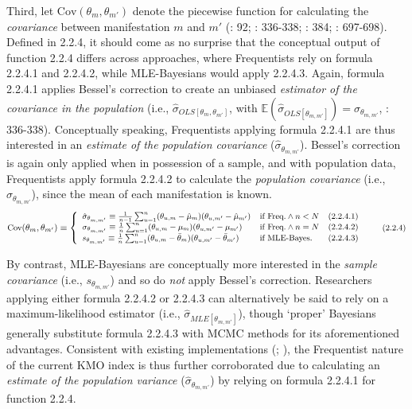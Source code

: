 \documentclass[
  10pt,
  a4paper,
  twoside]{article}
\begin{document}
Third, let \(\text{Cov}(\theta_m, \theta_{m'})\) denote the piecewise function for calculating the \emph{covariance} between manifestation \(m\) and \(m'\) (: 92; : 336-338; : 384; : 697-698). Defined in 2.2.4, it should come as no surprise that the conceptual output of function 2.2.4 differs across approaches, where Frequentists rely on formula 2.2.4.1 and 2.2.4.2, while MLE-Bayesians would apply 2.2.4.3. Again, formula 2.2.4.1 applies Bessel's correction to create an unbiased \emph{estimator of the covariance in the population} (i.e., \(\hat{\sigma}_{OLS[\theta_m, \theta_{m'}]}\), with \(\mathbb{E}(\hat{\sigma}_{OLS[\theta_{m,m'}]}) = \sigma_{\theta_{m,m'}}\), : 336-338). Conceptually speaking, Frequentists applying formula 2.2.4.1 are thus interested in an \emph{estimate of the population covariance} (\(\hat{\sigma}_{\theta_{m,m'}}\)). Bessel's correction is again only applied when in possession of a sample, and with population data, Frequentists apply formula 2.2.4.2 to calculate the \emph{population covariance} (i.e., \(\sigma_{\theta_{m,m'}}\)), since the mean of each manifestation is known.
\[
\small
\text{Cov}(\theta_m, \theta_{m'}) \equiv
\left\{
\begin{array}{lll}
  \hat{\sigma}_{\theta_{m,m'}} \equiv \frac{1}{n - 1} \sum_{u=1}^{n} (\theta_{u,m} - \hat{\mu}_m)(\theta_{u,m'} - \hat{\mu}_{m'}) & \text{if Freq.} \land n < N & \text{(2.2.4.1)} \\
  \sigma_{\theta_{m,m'}} \equiv \frac{1}{n} \sum_{u=1}^{n} (\theta_{u,m} - \mu_m)(\theta_{u,m'} - \mu_{m'}) & \text{if Freq.} \land n = N & \text{(2.2.4.2)} \\
  s_{\theta_{m,m'}} \equiv \frac{1}{n} \sum_{u=1}^{n} (\theta_{u,m} - \bar{\theta}_m)(\theta_{u,m'} - \bar{\theta}_{m'}) & \text{if MLE-Bayes.} & \text{(2.2.4.3)}
\end{array}
\right.
\tag{2.2.4}
\]

By contrast, MLE-Bayesians are conceptually more interested in the \emph{sample covariance} (i.e., \(s_{\theta_{m,m'}}\)) and so do \emph{not} apply Bessel's correction. Researchers applying either formula 2.2.4.2 or 2.2.4.3 can alternatively be said to rely on a maximum-likelihood estimator (i.e., \(\hat{\sigma}_{MLE[\theta_{m,m'}]}\)), though `proper' Bayesians generally substitute formula 2.2.4.3 with MCMC methods for its aforementioned advantages. Consistent with existing implementations (; ), the Frequentist nature of the current KMO index is thus further corroborated due to calculating an \emph{estimate of the population variance} (\(\hat{\sigma}_{\theta_{m,m'}}\)) by relying on formula 2.2.4.1 for function 2.2.4.
\end{document}
